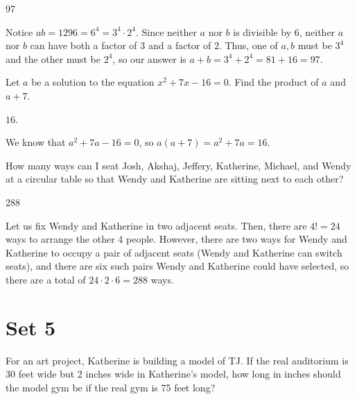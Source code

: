 \documentclass[11pt]{article}
\begin{document}
\begin{answer}
97
\end{answer}

\begin{solution}
Notice $ab = 1296 = 6^4 = 3^4 \cdot 2^4$. Since neither $a$ nor $b$ is divisible by $6$, neither $a$ nor $b$ can have both a factor of $3$ and a factor of $2$. Thus, one of $a,b$ must be $3^4$ and the other must be $2^4$, so our answer is $a+b = 3^4 + 2^4 = 81 + 16 = \boxed{97}$.
\end{solution}


\begin{problem}
Let $a$ be a solution to the equation $x^2 + 7x - 16 = 0$. Find the product of $a$ and $a+7$.
\end{problem}

\begin{answer}
$\boxed{16}$.
\end{answer}

\begin{solution}
We know that $a^2 + 7a - 16 = 0$, so $a(a+7) = a^2 + 7a = \boxed{16}$.
\end{solution}


\begin{problem}
How many ways can I seat Josh, Akshaj, Jeffery, Katherine, Michael, and Wendy at a circular table so that Wendy and Katherine are sitting next to each other?
\end{problem}

\begin{answer}
288
\end{answer}

\begin{solution}
Let us fix Wendy and Katherine in two adjacent seats. Then, there are $4!=24$ ways to arrange the other 4 people. However, there are two ways for Wendy and Katherine to occupy a pair of adjacent seats (Wendy and Katherine can switch seats), and there are six such pairs Wendy and Katherine could have selected, so there are a total of $24 \cdot 2 \cdot 6 = \boxed{288}$ ways.
\end{solution}


\newpage
\section*{Set 5}
\begin{problem}
For an art project, Katherine is building a model of TJ. If the real auditorium is 30 feet wide but 2 inches wide in Katherine's model, how long in inches should the model gym be if the real gym is 75 feet long?
\end{problem}
\end{document}
